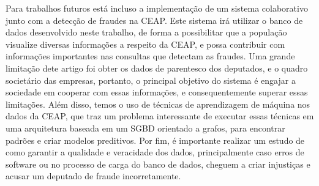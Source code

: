 \documentclass[12pt]{article}
\begin{document}
Para trabalhos futuros está incluso a implementação de um sistema colaborativo junto com a detecção de fraudes na CEAP. Este sistema irá utilizar o banco de dados desenvolvido neste trabalho, de forma a possibilitar que a população visualize diversas informações a respeito da CEAP, e possa contribuir com informações importantes nas consultas que detectam as fraudes. Uma grande limitação dete artigo foi obter os dados de parentesco dos deputados, e o quadro societário das empresas, portanto, o principal objetivo do sistema é engajar a sociedade em cooperar com essas informações, e consequentemente superar essas limitações. Além disso, temos o uso de técnicas de aprendizagem de máquina nos dados da CEAP, que traz um problema interessante de executar essas técnicas em uma arquitetura baseada em um SGBD orientado a grafos, para encontrar padrões e criar modelos preditivos. Por fim, é importante realizar um estudo de como garantir a qualidade e veracidade dos dados, principalmente caso erros de software ou no processo de carga do banco de dados, cheguem a criar injustiças e acusar um deputado de fraude incorretamente.



\end{document}
